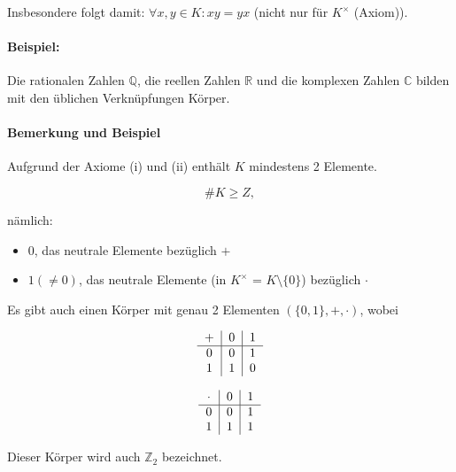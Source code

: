 	Insbesondere folgt damit: $\forall x,y\in K: xy = yx$ (nicht nur für $K^\times$ (Axiom)).
\paragraph{Beispiel:}
	Die rationalen Zahlen $\mathbb{Q}$, die reellen Zahlen $\mathbb{R}$ und die komplexen Zahlen $\mathbb{C}$ bilden mit den üblichen Verknüpfungen Körper.

\paragraph{Bemerkung und Beispiel}
	Aufgrund der Axiome (i) und (ii) enthält $ K $ mindestens 2 Elemente.

	\begin{equation*}
		\# K \geq Z,
	\end{equation*}
	
	nämlich:
	\begin{itemize}
		\item $ 0 $, das neutrale Elemente bezüglich $+$
		\item $1 (\neq 0)$, das neutrale Elemente (in $K^\times$ = $K\setminus\{0\}$) bezüglich $\cdot$
	\end{itemize}
	
	Es gibt auch einen Körper mit genau 2 Elementen $(\{0,1\},+,\cdot)$, wobei

	\begin{minipage}{0.45\textwidth}
		\begin{equation*}
			\begin{tabular}{c|c|c}
				$+$ & 0 & 1\\\hline
				0 & 0 & 1\\
				1 & 1 & 0\\
			\end{tabular}
		\end{equation*}
	\end{minipage}
	\begin{minipage}{0.45\textwidth}
		\begin{equation*}
			\begin{tabular}{c|c|c}
				$\cdot$ & 0 & 1\\\hline
				0 & 0 & 1\\
				1 & 1 & 1\\
			\end{tabular}
		\end{equation*}
	\end{minipage}
	
	Dieser Körper wird auch $\mathbb{Z}_2$ bezeichnet.

